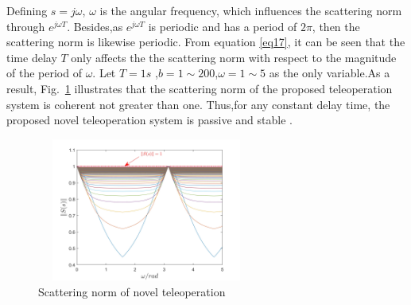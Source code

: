\par Defining $s = j\omega$,
$\omega$ is the angular frequency, which influences the scattering norm through $e^{j\omega T}$.
Besides,as $e^{j\omega T}$ is periodic and has a period of $2\pi$,
then the scattering norm is likewise periodic.
From equation \eqref{eq17}, it can be seen that the time delay $T$ only affects the
the scattering norm with respect to the magnitude of the period of $\omega$.
Let $T = 1s$ ,$b=1 \sim 200$,$\omega = 1 \sim 5$ as the only variable.As a result,
Fig.~\ref{fig5} illustrates that the scattering norm of
the proposed teleoperation system is coherent not greater than one.
Thus,for any constant delay time,
the proposed novel teleoperation system is passive and stable .
\begin{figure}[htbp]
    \centerline{\includegraphics[height=4.7cm,width=7.2cm]{S.jpg}}
    \caption{Scattering norm of novel teleoperation}
    \label{fig5}
\end{figure}
